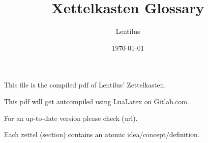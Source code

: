 \documentclass{article}
\title{Xettelkasten Glossary}
\author{Lentilus}
\date{\today}
\begin{document}
\maketitle

\begin{mdframed}
   This file is the compiled pdf of Lentilus' Zettelkasten.

   This pdf will get autcompiled using LuaLatex on Gitlab.com.

   For an up-to-date version please check (url).

   Each zettel (section) contains an atomic idea/concept/definition.

\end{mdframed}
\newpage


\end{document}
